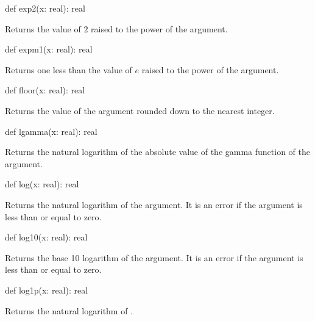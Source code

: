 \begin{protohead}
def exp2(x: real): real
\end{protohead}
\begin{protobody}
Returns the value of $2$ raised to the power of the argument.
\end{protobody}

\begin{protohead}
def expm1(x: real): real
\end{protohead}
\begin{protobody}
Returns one less than the value of $e$ raised to the power of the argument.
\end{protobody}

\begin{protohead}
def floor(x: real): real
\end{protohead}
\begin{protobody}
Returns the value of the argument rounded down to the nearest integer.
\end{protobody}

\begin{protohead}
def lgamma(x: real): real
\end{protohead}
\begin{protobody}
Returns the natural logarithm of the absolute value of the gamma
function of the argument.
\end{protobody}

\begin{protohead}
def log(x: real): real
\end{protohead}
\begin{protobody}
Returns the natural logarithm of the argument.  It is an error if the
argument is less than or equal to zero.
\end{protobody}

\begin{protohead}
def log10(x: real): real
\end{protohead}
\begin{protobody}
Returns the base 10 logarithm of the argument.  It is an error if the
argument is less than or equal to zero.
\end{protobody}

\begin{protohead}
def log1p(x: real): real
\end{protohead}
\begin{protobody}
Returns the natural logarithm of .
\end{protobody}


